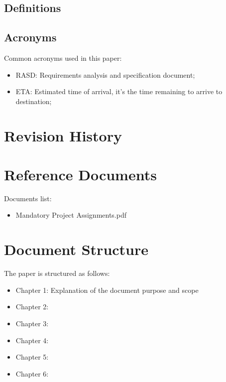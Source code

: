 \subsection{Definitions}
%
\subsection{Acronyms}
Common acronyms used in this paper:
\begin{itemize}
\item RASD: Requirements analysis and specification document;
\item ETA: Estimated time of arrival, it's the time remaining to arrive to destination;
\end{itemize}
%
%
\section{Revision History}
%
%
\section{Reference Documents}
Documents list:
\begin{itemize}
\item Mandatory Project Assignments.pdf
\end{itemize}
%
%
\section{Document Structure}
The paper is structured as follows:
\begin{itemize}
\item Chapter 1: Explanation of the document purpose and scope
\item Chapter 2:
\item Chapter 3:
\item Chapter 4:
\item Chapter 5:
\item Chapter 6:
\end{itemize}
%
